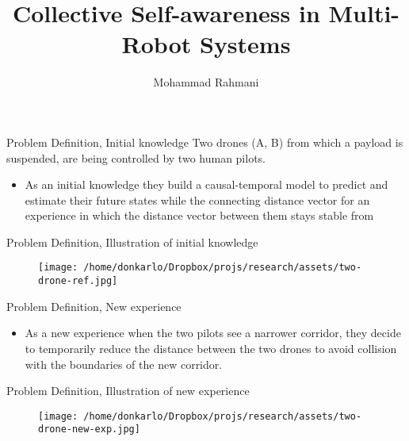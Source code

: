 \documentclass[unknownkeysallowed]{beamer}
\title{Collective Self-awareness in Multi-Robot Systems}
\author{Mohammad Rahmani}
\institute{Pervaisiive Computing Group}
\begin{document}
	\begin{frame}
	\maketitle
\end{frame}

	\begin{frame}{Problem Definition, Initial knowledge}
		Two drones (A, B) from which a payload is suspended, are being controlled by two human pilots. 
		\begin{itemize}
			\item As an initial knowledge they build a causal-temporal model to predict and estimate their future states while the connecting distance vector for an experience in which the distance vector between them stays stable from 
		\end{itemize} 
	\end{frame}

	\begin{frame}{Problem Definition, Illustration of initial knowledge}
		\begin{figure}
			\texttt{[image: /home/donkarlo/Dropbox/projs/research/assets/two-drone-ref.jpg]}
			\caption{}
		\end{figure}
	\end{frame}

	\begin{frame}{Problem Definition, New experience}
		\begin{itemize}
			\item As a new experience when the two pilots see a narrower corridor, they decide to temporarily reduce the distance between the two drones to avoid collision with the boundaries of the new corridor.  
		\end{itemize} 
	\end{frame}

	\begin{frame}{Problem Definition, Illustration of new experience}
		\begin{figure}
			\texttt{[image: /home/donkarlo/Dropbox/projs/research/assets/two-drone-new-exp.jpg]}
			\caption{}
		\end{figure}
	\end{frame}
\end{document}
